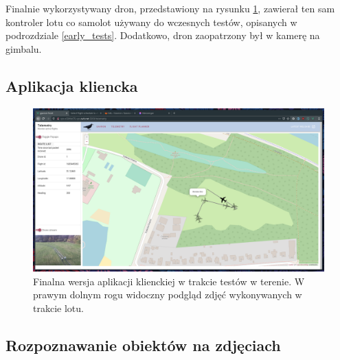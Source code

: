 Finalnie wykorzystywany dron, przedstawiony na rysunku \ref{testing_drone}, zawierał
ten sam kontroler lotu co samolot używany do wczesnych testów, opisanych w podrozdziale 
\ref{early_tests}. Dodatkowo, dron zaopatrzony był w kamerę na gimbalu.

\subsection{Aplikacja kliencka}

\begin{figure}[H]
	\centering
	\includegraphics[width=0.8\linewidth]{rys05/final_flight_telem.png}
    \caption{
        Finalna wersja aplikacji klienckiej w trakcie testów w terenie. 
        W prawym dolnym rogu widoczny podgląd zdjęć wykonywanych w trakcie lotu.
    }
	\label{testing_drone}
\end{figure}


\subsection{Rozpoznawanie obiektów na zdjęciach}


